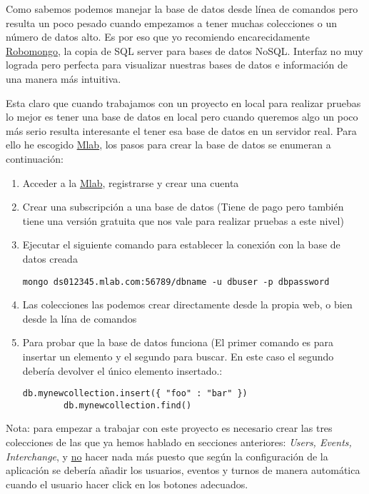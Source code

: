 Como sabemos podemos manejar la base de datos desde línea de comandos pero resulta un poco pesado cuando empezamos a tener muchas colecciones o un número de datos alto. Es por eso que yo recomiendo encarecidamente  \href{https://robomongo.org/}{Robomongo}, la copia de SQL server para bases de datos NoSQL.  Interfaz no muy lograda pero perfecta para visualizar nuestras bases de datos e información de una manera más intuitiva.

	
	Esta claro que cuando trabajamos con un proyecto en local para realizar pruebas lo mejor es tener una base de datos en local pero cuando queremos algo un poco más serio resulta interesante el tener esa base de datos en un servidor real. Para ello he escogido \href{mlab.com}{Mlab}, los pasos para crear la base de datos se enumeran a continuación: 
	
	\begin{enumerate}
	\item Acceder a la \href{mlab.com}{Mlab}, registrarse y crear una cuenta
	\item Crear una subscripción a una base de datos (Tiene de pago pero también tiene una versión gratuita que nos vale para realizar pruebas a este nivel)
	\item Ejecutar el siguiente comando para establecer la conexión con la base de datos creada
		\lstset{language=C, breaklines=true, basicstyle=\footnotesize}
		\begin{lstlisting}[frame=single]
		mongo ds012345.mlab.com:56789/dbname -u dbuser -p dbpassword
    	\end{lstlisting}
	\item Las colecciones las podemos crear directamente desde la propia web, o bien desde la lína de comandos 
	\item Para probar que la base de datos funciona (El primer comando es para insertar un elemento y el segundo para buscar. En este caso el segundo debería devolver el único elemento insertado.:
		\lstset{language=C, breaklines=true, basicstyle=\footnotesize}
		\begin{lstlisting}[frame=single]
		db.mynewcollection.insert({ "foo" : "bar" })
		db.mynewcollection.find() 
    	\end{lstlisting}	
\end{enumerate}

Nota: para empezar a trabajar con este proyecto es necesario crear las tres colecciones de las que ya hemos hablado en secciones anteriores: \emph{Users, Events, Interchange}, y \underline{no} hacer nada más puesto que según la configuración de la aplicación se debería añadir los usuarios, eventos y turnos de manera automática cuando el usuario hacer click en los botones adecuados. 


